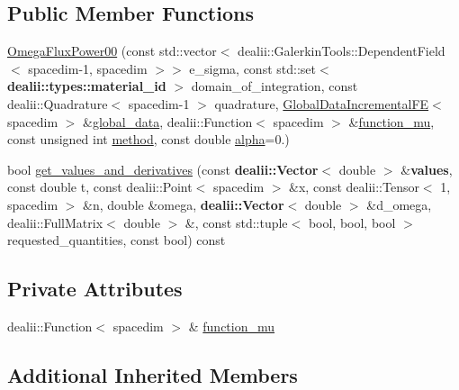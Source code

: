\subsection*{Public Member Functions}
\begin{DoxyCompactItemize}
\item 
\hyperlink{classincremental_f_e_1_1_omega_flux_power00_a90bd37bed7609d188bc543ecd466e198}{Omega\+Flux\+Power00} (const std\+::vector$<$ dealii\+::\+Galerkin\+Tools\+::\+Dependent\+Field$<$ spacedim-\/1, spacedim $>$$>$ e\+\_\+sigma, const std\+::set$<$ {\bf dealii\+::types\+::material\+\_\+id} $>$ domain\+\_\+of\+\_\+integration, const dealii\+::\+Quadrature$<$ spacedim-\/1 $>$ quadrature, \hyperlink{classincremental_f_e_1_1_global_data_incremental_f_e}{Global\+Data\+Incremental\+FE}$<$ spacedim $>$ \&\hyperlink{classincremental_f_e_1_1_omega_abd23d288a7a4a43f9b528be968cd2113}{global\+\_\+data}, dealii\+::\+Function$<$ spacedim $>$ \&\hyperlink{classincremental_f_e_1_1_omega_flux_power00_a9b8beb230f2a0609646ddebe08c1c236}{function\+\_\+mu}, const unsigned int \hyperlink{classincremental_f_e_1_1_omega_a7600d263ebf98129629e44fa67e8a58c}{method}, const double \hyperlink{classincremental_f_e_1_1_omega_a891688560ec0ad8dc5a0058a7b400269}{alpha}=0.)
\item 
bool \hyperlink{classincremental_f_e_1_1_omega_flux_power00_a6e690e461414dbedeef9035a656cc20b}{get\+\_\+values\+\_\+and\+\_\+derivatives} (const {\bf dealii\+::\+Vector}$<$ double $>$ \&{\bf values}, const double t, const dealii\+::\+Point$<$ spacedim $>$ \&x, const dealii\+::\+Tensor$<$ 1, spacedim $>$ \&n, double \&omega, {\bf dealii\+::\+Vector}$<$ double $>$ \&d\+\_\+omega, dealii\+::\+Full\+Matrix$<$ double $>$ \&, const std\+::tuple$<$ bool, bool, bool $>$ requested\+\_\+quantities, const bool) const 
\end{DoxyCompactItemize}
\subsection*{Private Attributes}
\begin{DoxyCompactItemize}
\item 
dealii\+::\+Function$<$ spacedim $>$ \& \hyperlink{classincremental_f_e_1_1_omega_flux_power00_a9b8beb230f2a0609646ddebe08c1c236}{function\+\_\+mu}
\end{DoxyCompactItemize}
\subsection*{Additional Inherited Members}


